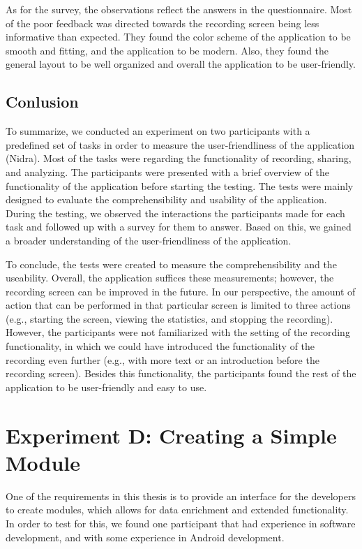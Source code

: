 As for the survey, the observations reflect the answers in the questionnaire. Most of the poor feedback was directed towards the recording screen being less informative than expected. They found the color scheme of the application to be smooth and fitting, and the application to be modern. Also, they found the general layout to be well organized and overall the application to be user-friendly.


\subsection{Conlusion}

To summarize, we conducted an experiment on two participants with a predefined set of tasks in order to measure the user-friendliness of the application (Nidra). Most of the tasks were regarding the functionality of recording, sharing, and analyzing. The participants were presented with a brief overview of the functionality of the application before starting the testing. The tests were mainly designed to evaluate the comprehensibility and usability of the application. During the testing, we observed the interactions the participants made for each task and followed up with a survey for them to answer. Based on this, we gained a broader understanding of the user-friendliness of the application.

To conclude, the tests were created to measure the comprehensibility and the useability. Overall, the application suffices these measurements; however, the recording screen can be improved in the future. In our perspective, the amount of action that can be performed in that particular screen is limited to three actions (e.g., starting the screen, viewing the statistics, and stopping the recording). However, the participants were not familiarized with the setting of the recording functionality, in which we could have introduced the functionality of the recording even further (e.g., with more text or an introduction before the recording screen). Besides this functionality, the participants found the rest of the application to be user-friendly and easy to use.


\section{Experiment D: Creating a Simple Module}
One of the requirements in this thesis is to provide an interface for the developers to create modules, which allows for data enrichment and extended functionality. In order to test for this, we found one participant that had experience in software development, and with some experience in Android development.

